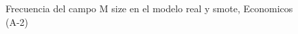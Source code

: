 \begin{figure}[H]
    \centering
    
    \caption{Frecuencia del campo M size en el modelo real y smote, Economicos (A-2)}
    \label{frecuency-M Size-smote-enc}
\end{figure}